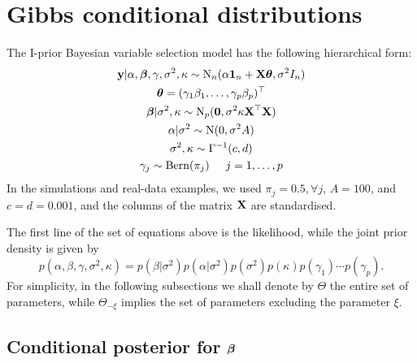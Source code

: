 \section{Gibbs conditional distributions}
\label{apx:gibbsbvs}

The I-prior Bayesian variable selection model has the following hierarchical form:
\begin{align*}
  \begin{gathered}
    {\mathbf y}|\alpha,{\bm\beta},\gamma,\sigma^2,\kappa \sim \operatorname{N}_n(\alpha{\mathbf 1}_n + {\mathbf X}{\bm\theta}, \sigma^2 I_n) \\
    {\bm\theta} = (\gamma_1\beta_1,\dots,\gamma_p\beta_p)^\top \\
    {\bm\beta}|\sigma^2,\kappa \sim \operatorname{N}_p({\mathbf 0},\sigma^2\kappa \mathbf X^\top \mathbf X) \\
    \alpha|\sigma^2 \sim \operatorname{N}(0,\sigma^2 A) \\
    \sigma^2,\kappa \sim \Gamma^{-1}(c,d) \\
    \gamma_j \sim \operatorname{Bern}(\pi_j) \hspace{0.5cm} j=1,\dots,p
  \end{gathered}
\end{align*}
In the simulations and real-data examples, we used $\pi_j=0.5, \forall j$, $A=100$, and $c=d=0.001$, and the columns of the matrix ${\mathbf X}$ are standardised.

The first line of the set of equations above is the likelihood, while the joint prior density is given by
\[
  p(\alpha,\beta,\gamma,\sigma^2,\kappa) = p(\beta|\sigma^2)p(\alpha|\sigma^2)p(\sigma^2)p(\kappa)p(\gamma_1)\cdots p(\gamma_p).
\]    
For simplicity, in the following subsections we shall denote by $\Theta$ the entire set of parameters, while $\Theta_{-\xi}$ implies the set of parameters excluding the parameter $\xi$.

\subsection{Conditional posterior for \texorpdfstring{${\bm\beta}$}{$beta$}}

